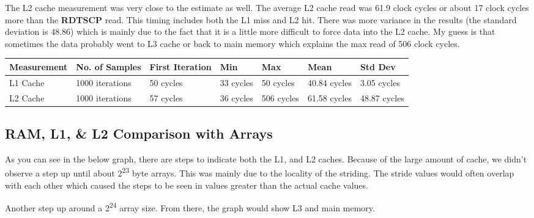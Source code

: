 \documentclass[paper=a4, fontsize=11pt]{scrartcl}
\numberwithin{equation}{section}        %
\numberwithin{figure}{section}          %
\numberwithin{table}{section}               %
\begin{document}
The L2 cache measurement was very close to the estimate as well.  The average L2 cache read was 61.9 clock cycles or about 17 clock cycles more than the \textbf{RDTSCP} read.  This timing includes both the L1 miss and L2 hit.  There was more variance in the results (the standard deviation is 48.86) which is mainly due to the fact that it is a little more difficult to force data into the L2 cache.  My guess is that sometimes the data probably went to L3 cache or back to main memory which explains the max read of 506 clock cycles. 

\begin{center}
    \begin{tabular}{ | l | l | l | l | l | l | l |}
    \hline
    Measurement & No. of Samples & First Iteration & Min & Max & Mean & Std Dev \\
    \hline
    L1 Cache & 1000 iterations & 50 cycles & 33 cycles & 50 cycles & 40.84 cycles & 3.05  cycles \\ 
    L2 Cache & 1000 iterations & 57 cycles & 36 cycles & 506 cycles & 61.58 cycles & 48.87  cycles \\ 
    \hline
    \end{tabular}
\end{center}

\subsection{RAM, L1, \& L2 Comparison with Arrays}

As you can see in the below graph, there are steps to indicate both the L1, and L2 caches.  Because of the large amount of cache, we didn't observe a step up until about 2\textsuperscript{23} byte arrays.  This was mainly due to the locality of the striding.  The stride values would often overlap with each other which caused the steps to be seen in values greater than the actual cache values.

Another step up around a 2\textsuperscript{24} array size.  From there, the graph would show L3 and main memory.
\end{document}
